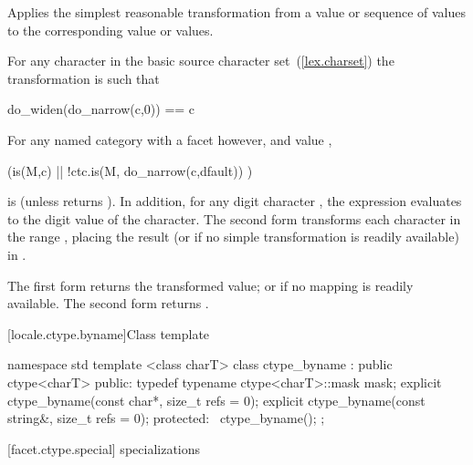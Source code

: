 \begin{itemdescr}
\pnum
\effects
Applies the simplest reasonable transformation from a
value or sequence of
values to the corresponding
value or values.

For any character  in the basic source character set~(\ref{lex.charset})
the transformation is such that

\begin{codeblock}
do_widen(do_narrow(c,0)) == c
\end{codeblock}

For any named
category with a
facet  however, and
value ,

\begin{codeblock}
(is(M,c) || !ctc.is(M, do_narrow(c,dfault)) )
\end{codeblock}

is
(unless
returns
).
In addition, for any digit character ,
the expression
evaluates to the digit value of the character.
The second form transforms each character
in the range
,
placing the result (or 
if no simple transformation is readily available) in
.

\pnum
\returns
The first form returns the transformed value; or 
if no mapping is readily available.
The second form returns .
\end{itemdescr}

[locale.ctype.byname]{Class template }

%
\begin{codeblock}
namespace std {
  template <class charT>
  class ctype_byname : public ctype<charT> {
  public:
    typedef typename ctype<charT>::mask mask;
    explicit ctype_byname(const char*, size_t refs = 0);
    explicit ctype_byname(const string&, size_t refs = 0);
  protected:
   ~ctype_byname();
  };
}
\end{codeblock}

[facet.ctype.special]{ specializations}

